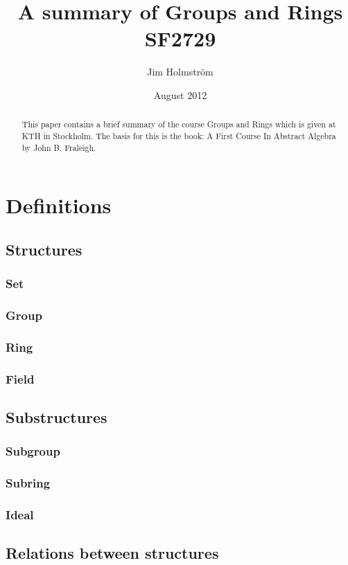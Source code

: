 \documentclass[a4paper,11pt]{kth-mag}
\title{A summary of Groups and Rings SF2729}
\subtitle{}
\author{Jim Holmstr\"{o}m}
\date{August 2012}
\begin{document}
\frontmatter
\pagestyle{empty}
\removepagenumbers
\maketitle
{}
\begin{abstract}
  This paper contains a brief summary of the course Groups and Rings which is
  given at KTH in Stockholm. The basis for this is the book: A First Course In
  Abstract Algebra by John B. Fraleigh.

\end{abstract}
\clearpage
\tableofcontents*
\mainmatter
\pagestyle{newchap}
\chapter{Definitions}

\section{Structures}
\subsection{Set}
\subsection{Group}
\subsection{Ring}
\subsection{Field}

\section{Substructures}
\subsection{Subgroup}
\subsection{Subring}
\subsection{Ideal}

\section{Relations between structures}
\end{document}
